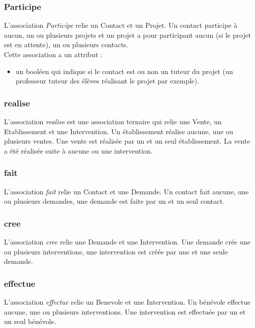 \subsubsection*{Participe}
L'association \textit{Participe} relie un Contact et un Projet. Un contact participe à aucun, un ou plusieurs projets et un projet a pour participant aucun (si le projet est en attente), un ou plusieurs contacts.\\
Cette association a un attribut :
\begin{itemize}
\item un booléen qui indique si le contact est ou non un tuteur du projet (un professeur tuteur des élèves réalisant le projet par exemple). 
\end{itemize}

\subsubsection*{realise}

L'association \textit{realise} est une association ternaire qui relie une Vente, un Etablissement et une Intervention. Un établissement réalise aucune, une ou plusieurs ventes. Une vente est réalisée par un et un seul établissement. La vente a été réalisée suite à aucune ou une intervention.

\subsubsection*{fait}

L'association \textit{fait} relie un Contact et une Demande. Un contact fait aucune, une ou plusieurs demandes, une demande est faite par un et un seul contact.

\subsubsection*{cree}

L'association \textit{cree} relie une Demande et une Intervention. Une demande crée une ou plusieurs interventions, une intervention est créée par une et une seule demande.

\subsubsection*{effectue} 

L'association \textit{effectue} relie un Benevole et une Intervention. Un bénévole effectue aucune, une ou plusieurs interventions. Une intervention est effectuée par un et un seul bénévole. 

